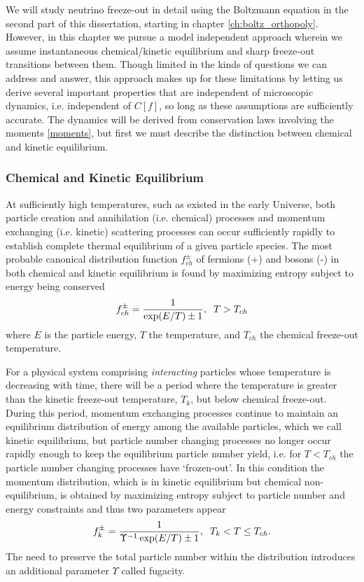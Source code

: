We will study neutrino freeze-out in detail using the Boltzmann equation in the second part of this dissertation, starting in chapter \ref{ch:boltz_orthopoly}. However, in this chapter we pursue a model independent approach wherein we assume instantaneous chemical/kinetic equilibrium and sharp freeze-out transitions between them.  Though limited in the kinds of questions we can address and answer, this approach makes up for these limitations by letting us derive several important properties that are independent of microscopic dynamics, i.e. independent of $C[f]$, so long as these assumptions are sufficiently accurate.  The dynamics will be derived from conservation laws involving the moments \ref{moments}, but first we must describe the distinction between chemical and kinetic equilibrium.


\subsubsection{Chemical and Kinetic Equilibrium}
At sufficiently high temperatures, such as existed in the early Universe, both particle creation and annihilation (i.e. chemical) processes and momentum exchanging (i.e. kinetic) scattering processes can occur sufficiently rapidly to establish complete thermal equilibrium of a given particle species. The most probable canonical distribution function $f_{ch}^\pm$ of  fermions (+) and bosons (-) in both chemical and kinetic equilibrium is found by maximizing entropy subject to energy being conserved
\begin{equation}\label{ch_eq}
f_{ch}^\pm=\frac{1}{\exp(E/T)\pm 1}, \hspace{2mm} T>T_{ch}
\end{equation}
where $E$ is the particle energy, $T$ the temperature, and $T_{ch}$ the chemical freeze-out temperature. 


For a physical system comprising {\em interacting} particles whose temperature is decreasing with time, there will be a period where the temperature is greater than the kinetic freeze-out temperature, $T_k$, but below chemical freeze-out. During this period, momentum exchanging processes continue to maintain an equilibrium distribution of energy among the available particles, which we call kinetic equilibrium, but particle number changing processes no longer occur rapidly enough to keep the equilibrium particle number yield, i.e. for $T<T_{ch}$ the particle number changing processes have `frozen-out'. In this condition the momentum distribution, which is in kinetic equilibrium but chemical non-equilibrium, is obtained by maximizing  entropy subject to  particle number and energy constraints and thus two parameters appear
\begin{equation}\label{k_eq}
f_{k}^\pm=\frac{1}{\Upsilon^{-1} \exp(E/T)\pm 1},\hspace{2mm} T_k<T\leq T_{ch}.
\end{equation}
The need to preserve the total particle number within the distribution introduces an additional parameter $\Upsilon$ called fugacity. 



